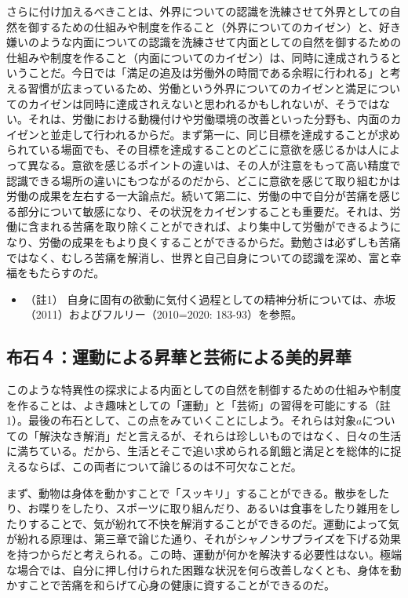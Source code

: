 さらに付け加えるべきことは、外界についての認識を洗練させて外界としての自然を御するための仕組みや制度を作ること（外界についてのカイゼン）と、好き嫌いのような内面についての認識を洗練させて内面としての自然を御するための仕組みや制度を作ること（内面についてのカイゼン）は、同時に達成されうるということだ。今日では「満足の追及は労働外の時間である余暇に行われる」と考える習慣が広まっているため、労働という外界についてのカイゼンと満足についてのカイゼンは同時に達成されえないと思われるかもしれないが、そうではない。それは、労働における動機付けや労働環境の改善といった分野も、内面のカイゼンと並走して行われるからだ。まず第一に、同じ目標を達成することが求められている場面でも、その目標を達成することのどこに意欲を感じるかは人によって異なる。意欲を感じるポイントの違いは、その人が注意をもって高い精度で認識できる場所の違いにもつながるのだから、どこに意欲を感じて取り組むかは労働の成果を左右する一大論点だ。続いて第二に、労働の中で自分が苦痛を感じる部分について敏感になり、その状況をカイゼンすることも重要だ。それは、労働に含まれる苦痛を取り除くことができれば、より集中して労働ができるようになり、労働の成果をもより良くすることができるからだ。勤勉さは必ずしも苦痛ではなく、むしろ苦痛を解消し、世界と自己自身についての認識を深め、富と幸福をもたらすのだ。

\begin{itemize}
\tightlist
\item
  （註1）
  自身に固有の欲動に気付く過程としての精神分析については、赤坂（2011）\cite{Akasaka}およびフルリー（2010=2020:
  183-93）\cite{Floury}を参照。
\end{itemize}

\subsection{布石４：運動による昇華と芸術による美的昇華}\label{ux5e03ux77f3uxff14ux904bux52d5ux306bux3088ux308bux6607ux83efux3068ux82b8ux8853ux306bux3088ux308bux7f8eux7684ux6607ux83ef}

このような特異性の探求による内面としての自然を制御するための仕組みや制度を作ることは、よき趣味としての「運動」と「芸術」の習得を可能にする（註1）。最後の布石として、この点をみていくことにしよう。それらは対象\(a\)についての「解決なき解消」だと言えるが、それらは珍しいものではなく、日々の生活に満ちている。だから、生活とそこで追い求められる飢餓と満足とを総体的に捉えるならば、この両者について論じるのは不可欠なことだ。

まず、動物は身体を動かすことで「スッキリ」することができる。散歩をしたり、お喋りをしたり、スポーツに取り組んだり、あるいは食事をしたり雑用をしたりすることで、気が紛れて不快を解消することができるのだ。運動によって気が紛れる原理は、第三章で論じた通り、それがシャノンサプライズを下げる効果を持つからだと考えられる。この時、運動が何かを解決する必要性はない。極端な場合では、自分に押し付けられた困難な状況を何ら改善しなくとも、身体を動かすことで苦痛を和らげて心身の健康に資することができるのだ。

